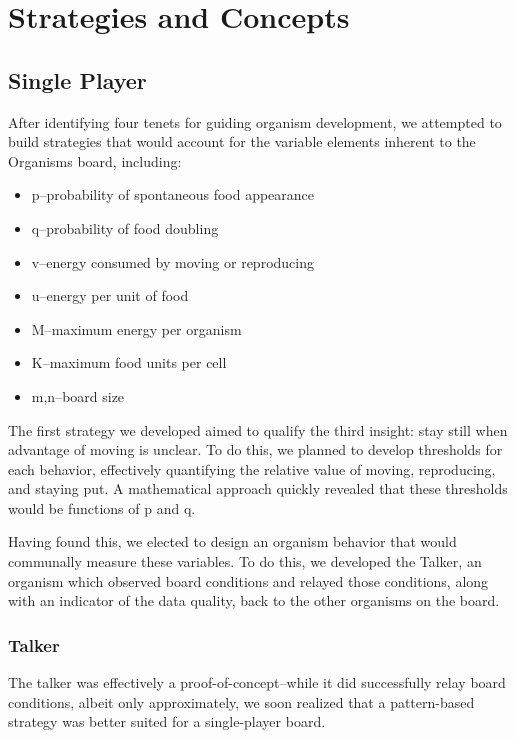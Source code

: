 \section{Strategies and Concepts}
\label{sec:strategies}

\subsection{Single Player}
After identifying four tenets for guiding organism development, we attempted to build strategies that would account for the variable elements inherent to the Organisms board, including:

\begin{itemize}
\item	p--probability of spontaneous food appearance
\item	q--probability of food doubling
\item	v--energy consumed by moving or reproducing
\item	u--energy per unit of food
\item	M--maximum energy per organism
\item	K--maximum food units per cell
\item	m,n--board size
\end{itemize}

The first strategy we developed aimed to qualify the third insight: stay still when advantage of moving is unclear.  To do this, we planned to develop thresholds for each behavior, effectively quantifying the relative value of moving, reproducing, and staying put.  A mathematical approach quickly revealed that these thresholds would be functions of p and q.

Having found this, we elected to design an organism behavior that would communally measure these variables.  To do this, we developed the Talker, an organism which observed board conditions and relayed those conditions, along with an indicator of the data quality, back to the other organisms on the board.


\subsubsection{Talker}

The talker was effectively a proof-of-concept--while it did successfully relay board conditions, albeit only approximately, we soon realized that a pattern-based strategy was better suited for a single-player board.

